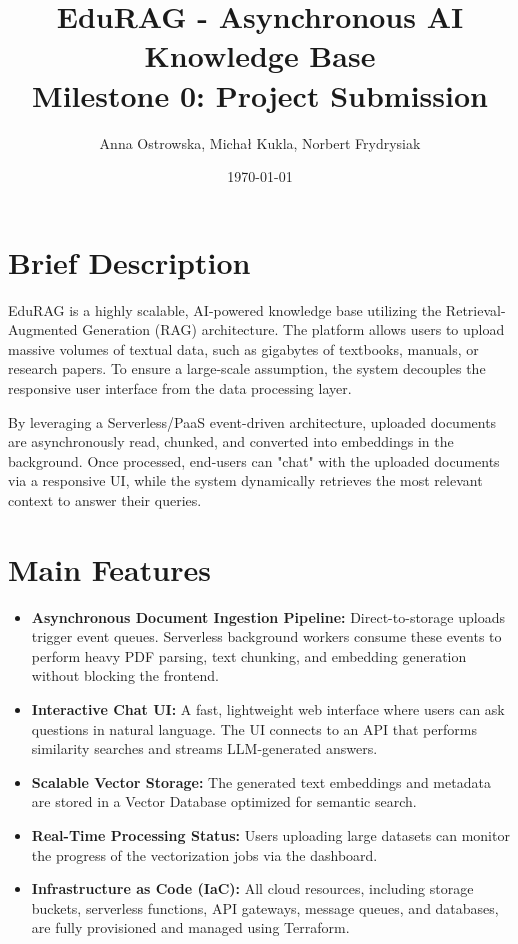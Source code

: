 \documentclass[12pt,a4paper]{article}
\title{\textbf{EduRAG - Asynchronous AI Knowledge Base} \\ \large Milestone 0: Project Submission}
\author{Anna Ostrowska, Michał Kukla, Norbert Frydrysiak}
\date{\today}
\begin{document}
\maketitle

\section{Brief Description}
EduRAG is a highly scalable, AI-powered knowledge base utilizing the Retrieval-Augmented Generation (RAG) architecture. The platform allows users to upload massive volumes of textual data, such as gigabytes of textbooks, manuals, or research papers. To ensure a large-scale assumption, the system decouples the responsive user interface from the data processing layer. 

By leveraging a Serverless/PaaS event-driven architecture, uploaded documents are asynchronously read, chunked, and converted into embeddings in the background. Once processed, end-users can "chat" with the uploaded documents via a responsive UI, while the system dynamically retrieves the most relevant context to answer their queries.

\section{Main Features}
\begin{itemize}[label=\textbullet]
    \item \textbf{Asynchronous Document Ingestion Pipeline:} Direct-to-storage uploads trigger event queues. Serverless background workers consume these events to perform heavy PDF parsing, text chunking, and embedding generation without blocking the frontend.
    \item \textbf{Interactive Chat UI:} A fast, lightweight web interface where users can ask questions in natural language. The UI connects to an API that performs similarity searches and streams LLM-generated answers.
    \item \textbf{Scalable Vector Storage:} The generated text embeddings and metadata are stored in a Vector Database optimized for semantic search.
    \item \textbf{Real-Time Processing Status:} Users uploading large datasets can monitor the progress of the vectorization jobs via the dashboard.
    \item \textbf{Infrastructure as Code (IaC):} All cloud resources, including storage buckets, serverless functions, API gateways, message queues, and databases, are fully provisioned and managed using Terraform.
\end{itemize}
\end{document}
